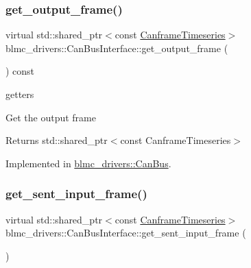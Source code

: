 \subsubsection{\texorpdfstring{get\+\_\+output\+\_\+frame()}{get\_output\_frame()}}
{\footnotesize\ttfamily virtual std\+::shared\+\_\+ptr$<$const \hyperlink{classblmc__drivers_1_1CanBusInterface_a2da2627c961927f48359ae7d7e1aa4da}{Canframe\+Timeseries}$>$ blmc\+\_\+drivers\+::\+Can\+Bus\+Interface\+::get\+\_\+output\+\_\+frame (\begin{DoxyParamCaption}{ }\end{DoxyParamCaption}) const\hspace{0.3cm}{\ttfamily [pure virtual]}}



getters 

Get the output frame

\begin{DoxyReturn}{Returns}
std\+::shared\+\_\+ptr$<$const Canframe\+Timeseries$>$ 
\end{DoxyReturn}


Implemented in \hyperlink{classblmc__drivers_1_1CanBus_a449fa3c1b73a9282193ce85b56e9a729}{blmc\+\_\+drivers\+::\+Can\+Bus}.

\mbox{\label{classblmc__drivers_1_1CanBusInterface_aca7e703983284a09c497c8182c0684d5}} 
\subsubsection{\texorpdfstring{get\+\_\+sent\+\_\+input\+\_\+frame()}{get\_sent\_input\_frame()}}
{\footnotesize\ttfamily virtual std\+::shared\+\_\+ptr$<$const \hyperlink{classblmc__drivers_1_1CanBusInterface_a2da2627c961927f48359ae7d7e1aa4da}{Canframe\+Timeseries}$>$ blmc\+\_\+drivers\+::\+Can\+Bus\+Interface\+::get\+\_\+sent\+\_\+input\+\_\+frame (\begin{DoxyParamCaption}{ }\end{DoxyParamCaption})\hspace{0.3cm}{\ttfamily [pure virtual]}}



